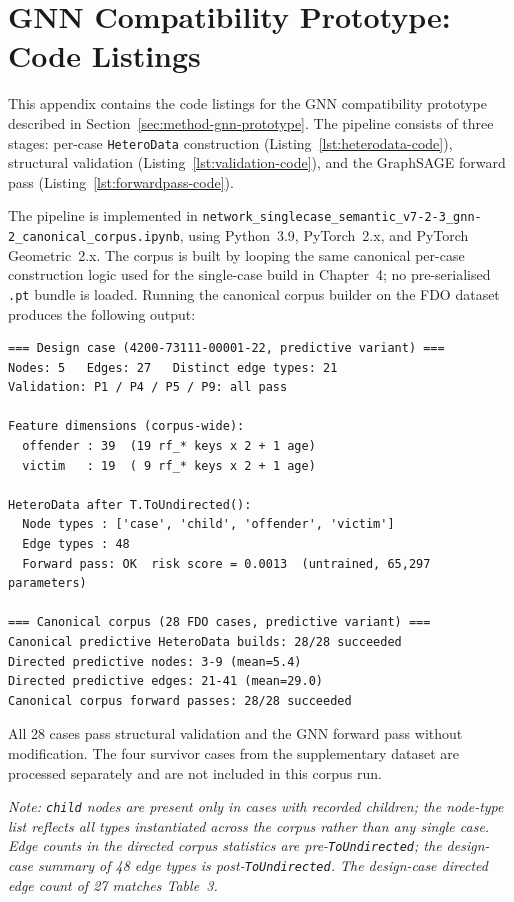 \section{GNN Compatibility Prototype: Code Listings}
\label{app:gnn-prototype}
This appendix contains the code listings for the GNN compatibility prototype
described in Section~\ref{sec:method-gnn-prototype}. The pipeline consists of
three stages: per-case \texttt{HeteroData} construction
(Listing~\ref{lst:heterodata-code}), structural validation
(Listing~\ref{lst:validation-code}), and the GraphSAGE forward pass
(Listing~\ref{lst:forwardpass-code}).

The pipeline is implemented in
\texttt{network\_singlecase\_semantic\_v7-2-3\_gnn-2\_canonical\_corpus.ipynb},
using Python~3.9, PyTorch~2.x, and PyTorch Geometric~2.x. The corpus is built
by looping the same canonical per-case construction logic used for the
single-case build in Chapter~4; no pre-serialised \texttt{.pt} bundle is
loaded. Running the canonical corpus builder on the FDO dataset produces the
following output:

\begin{verbatim}
=== Design case (4200-73111-00001-22, predictive variant) ===
Nodes: 5   Edges: 27   Distinct edge types: 21
Validation: P1 / P4 / P5 / P9: all pass

Feature dimensions (corpus-wide):
  offender : 39  (19 rf_* keys x 2 + 1 age)
  victim   : 19  ( 9 rf_* keys x 2 + 1 age)

HeteroData after T.ToUndirected():
  Node types : ['case', 'child', 'offender', 'victim']
  Edge types : 48
  Forward pass: OK  risk score = 0.0013  (untrained, 65,297 parameters)

=== Canonical corpus (28 FDO cases, predictive variant) ===
Canonical predictive HeteroData builds: 28/28 succeeded
Directed predictive nodes: 3-9 (mean=5.4)
Directed predictive edges: 21-41 (mean=29.0)
Canonical corpus forward passes: 28/28 succeeded
\end{verbatim}

\noindent All 28 cases pass structural validation and the GNN forward pass
without modification. The four survivor cases from the supplementary dataset
are processed separately and are not included in this corpus run.

\noindent\textit{Note: \texttt{child} nodes are present only in cases with
recorded children; the node-type list reflects all types instantiated across
the corpus rather than any single case. Edge counts in the directed corpus
statistics are pre-\texttt{ToUndirected}; the design-case summary of 48 edge
types is post-\texttt{ToUndirected}. The design-case directed edge count of
27 matches Table~3.}

